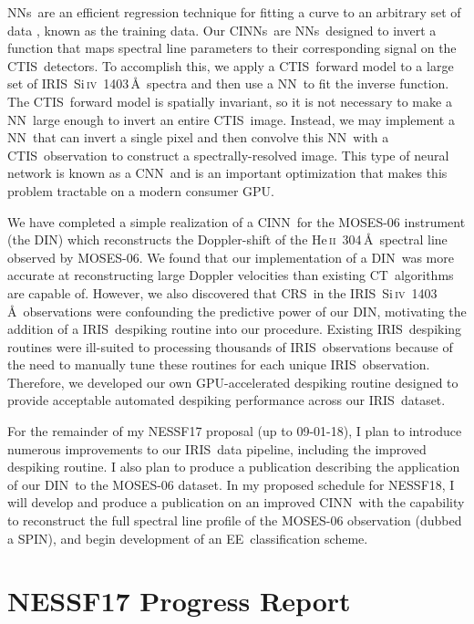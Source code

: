 \documentclass[10pt,letterpaper, doublespace]{article}
\newcommand{\SiIV}{Si\,\textsc{iv}~1403\,\AA}
\newcommand{\HeII}{He\,\textsc{ii}~304\,\AA}
\newcommand{\EE}{\ac{EE}}
\newcommand{\CT}{\ac{CT}}
\newcommand{\CTIS}{\ac{CTIS}}
\newcommand{\MOSES}{\ac{MOSES}}
\newcommand{\NN}{\ac{NN}}
\newcommand{\NNs}{\acp{NN}}
\newcommand{\CNN}{\ac{CNN}}
\newcommand{\CINN}{\ac{CINN}}
\newcommand{\CINNs}{\acp{CINN}}
\newcommand{\DIN}{\ac{DIN}}
\newcommand{\SPIN}{\ac{SPIN}}
\newcommand{\IRIS}{\ac{IRIS}}
\newcommand{\CRS}{\ac{CRS}}
\newcommand{\GPU}{\ac{GPU}}
\begin{document}
		\NNs\ are an efficient regression technique for fitting a curve to an arbitrary set of data \citep{ai}, known as the training data.
		Our \CINNs\ are \NNs\ designed to invert a function that maps spectral line parameters to their corresponding signal on the \CTIS\ detectors.
		To accomplish this, we apply a \CTIS\ forward model to a large set of \IRIS\ \SiIV\ spectra and then use a \NN\ to fit the inverse function.
		The \CTIS\ forward model is spatially invariant, so it is not necessary to make a \NN\ large enough to invert an entire \CTIS\ image.
		Instead, we may implement a \NN\ that can invert a single pixel and then convolve this \NN\ with a \CTIS\ observation to construct a spectrally-resolved image.
		This type of neural network is known as a \CNN\ and is an important optimization that makes this problem tractable on a modern consumer \GPU.
			
		We have completed a simple realization of a \CINN\ for the \MOSES-06 instrument (the \DIN) which reconstructs the Doppler-shift of the \HeII\ spectral line observed by \MOSES-06.
		We found that our implementation of a \DIN\ was more accurate at reconstructing large Doppler velocities than existing \CT\ algorithms are capable of.
		However, we also discovered that \CRS\ in the \IRIS\ \SiIV\ observations were confounding the predictive power of our \DIN, motivating the addition of a \IRIS\ despiking routine into our procedure.
		Existing \IRIS\ despiking routines were ill-suited to processing thousands of \IRIS\ observations because of the need to manually tune these routines for each unique \IRIS\ observation.
		Therefore, we developed our own GPU-accelerated despiking routine designed to provide acceptable automated despiking performance across our \IRIS\ dataset.
		
		For the remainder of my NESSF17 proposal (up to 09-01-18), I plan to introduce numerous improvements to our \IRIS\ data pipeline, including the improved despiking routine. I also plan to produce a publication describing the application of our \DIN\ to the \MOSES-06 dataset.
		In my proposed schedule for NESSF18, I will develop and produce a publication on an improved \CINN\ with the capability to reconstruct the full spectral line profile of the \MOSES-06 observation (dubbed a \SPIN), and begin development of an \EE\ classification scheme.		
		
	
	\section{NESSF17 Progress Report} 
	
\end{document}
